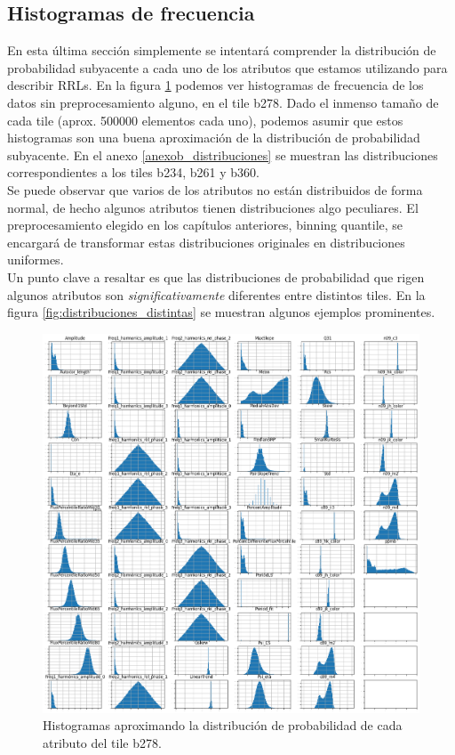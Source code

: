 \subsection{ Histogramas de frecuencia }
En esta última sección simplemente se intentará comprender la distribución de probabilidad subyacente a cada uno de los atributos que estamos utilizando para describir RRLs. En la figura \ref{fig:distribuciones} podemos ver histogramas de frecuencia de los datos sin preprocesamiento alguno, en el tile b278. Dado el inmenso tamaño de cada tile (aprox. 500000 elementos cada uno), podemos asumir que estos histogramas son una buena aproximación de la distribución de probabilidad subyacente. En el anexo \ref{anexob_distribuciones} se muestran las distribuciones correspondientes a los tiles b234, b261 y b360. \\

Se puede observar que varios de los atributos no están distribuidos de forma normal, de hecho algunos atributos tienen distribuciones algo peculiares. El preprocesamiento elegido en los capítulos anteriores, binning quantile, se encargará de transformar estas distribuciones originales en distribuciones uniformes. \\

Un punto clave a resaltar es que las distribuciones de probabilidad que rigen algunos atributos son \textit{significativamente} diferentes entre distintos tiles. En la figura \ref{fig:distribuciones_distintas} se muestran algunos ejemplos prominentes. 


\begin{figure}[h!]
  \includegraphics[width=\textwidth]{Kap6/allfeatures_b278.png}
\caption{Histogramas aproximando la distribución de probabilidad de cada atributo del tile b278.}
\label{fig:distribuciones}
\end{figure}


